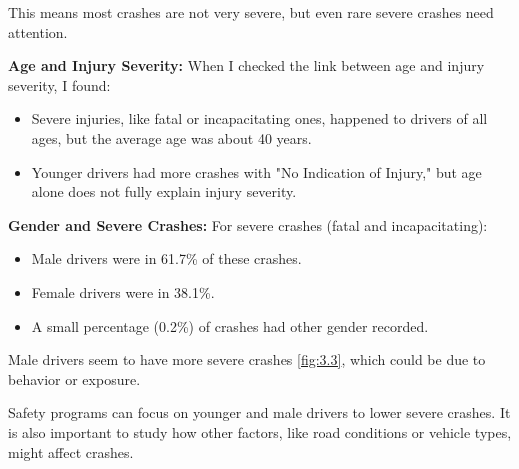 \documentclass[a4paper,12pt]{article}
\begin{document}
This means most crashes are not very severe, but even rare severe crashes need attention. 


\textbf{Age and Injury Severity:}
When I checked the link between age and injury severity, I found:

\begin{itemize}
    \item Severe injuries, like fatal or incapacitating ones, happened to drivers of all ages, but the average age was about 40 years.
    \item Younger drivers had more crashes with "No Indication of Injury," but age alone does not fully explain injury severity.
\end{itemize}

\textbf{Gender and Severe Crashes:}
For severe crashes (fatal and incapacitating):

\begin{itemize}
    \item Male drivers were in 61.7\% of these crashes.
    \item Female drivers were in 38.1\%.
    \item A small percentage (0.2\%) of crashes had other gender recorded.
\end{itemize}
Male drivers seem to have more severe crashes \ref{fig:3.3}, which could be due to behavior or exposure. 


Safety programs can focus on younger and male drivers to lower severe crashes. It is also important to study how other factors, like road conditions or vehicle types, might affect crashes.
\end{document}
